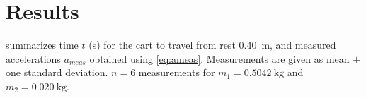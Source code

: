 \documentclass[reprint,amsmath,amssymb,aps,twoside]{revtex4-2}
\begin{document}







\section{Results}
 summarizes time $t$ (\unit{\second}) for the cart to travel from rest \qty{0.40}{\meter}, and measured accelerations $a_{meas}$ obtained using \cref{eq:ameas}. Measurements are given as mean $\pm$ one standard deviation. $n=6$ measurements for $m_1=\qty{0.5042}{\kilo\gram}$ and $m_2=\qty{0.020}{\kilo\gram}$.


\end{document}
